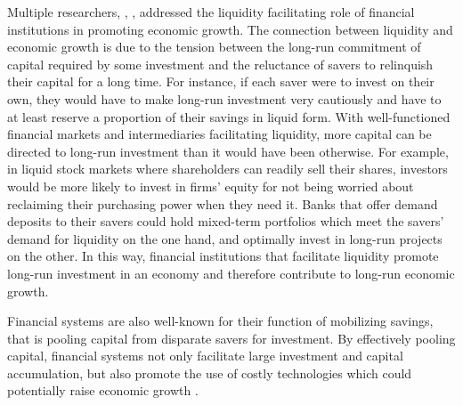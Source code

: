 \documentclass[AER]{AEA}
\begin{document}
Multiple researchers, \cite{diamond1983}, \cite{levine1991},
\cite{bencivenga1991} addressed the liquidity facilitating role of financial
institutions in promoting economic growth. The connection between liquidity and
economic growth is due to the tension between the long-run commitment of capital
required by some investment and the reluctance of savers to
relinquish their capital for a long time. For instance, if each saver were to
invest on their own, they would have to make long-run investment very cautiously
and have to at least reserve a proportion of their savings in liquid form. With
well-functioned financial markets and intermediaries facilitating liquidity,
more capital can be directed to long-run investment than it would have been
otherwise. For example, in liquid stock markets where shareholders can readily
sell their shares, investors would be more likely to invest in firms' equity for
not being worried about reclaiming their purchasing power when they need it.
Banks that offer demand deposits to their savers could hold mixed-term
portfolios which meet the savers' demand for liquidity on the one hand, and
optimally invest in long-run projects on the other. 
In this way, financial institutions that facilitate liquidity promote long-run 
investment in an economy and therefore contribute to long-run economic growth. 

Financial systems are also well-known for their function of mobilizing savings,
that is pooling capital from disparate savers for investment. By effectively
pooling capital, financial systems not only facilitate large investment and
capital accumulation, but also promote the use of costly technologies which  
could potentially raise economic growth \citep{mckinnon1973}. 

\end{document}
